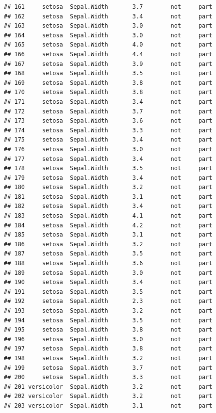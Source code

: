 \documentclass[krantz2]{krantz}\usepackage{knitr}%
\begin{document}
\begin{knitrout}
\begin{kframe}
\begin{verbatim}
## 161     setosa  Sepal.Width       3.7        not     part
## 162     setosa  Sepal.Width       3.4        not     part
## 163     setosa  Sepal.Width       3.0        not     part
## 164     setosa  Sepal.Width       3.0        not     part
## 165     setosa  Sepal.Width       4.0        not     part
## 166     setosa  Sepal.Width       4.4        not     part
## 167     setosa  Sepal.Width       3.9        not     part
## 168     setosa  Sepal.Width       3.5        not     part
## 169     setosa  Sepal.Width       3.8        not     part
## 170     setosa  Sepal.Width       3.8        not     part
## 171     setosa  Sepal.Width       3.4        not     part
## 172     setosa  Sepal.Width       3.7        not     part
## 173     setosa  Sepal.Width       3.6        not     part
## 174     setosa  Sepal.Width       3.3        not     part
## 175     setosa  Sepal.Width       3.4        not     part
## 176     setosa  Sepal.Width       3.0        not     part
## 177     setosa  Sepal.Width       3.4        not     part
## 178     setosa  Sepal.Width       3.5        not     part
## 179     setosa  Sepal.Width       3.4        not     part
## 180     setosa  Sepal.Width       3.2        not     part
## 181     setosa  Sepal.Width       3.1        not     part
## 182     setosa  Sepal.Width       3.4        not     part
## 183     setosa  Sepal.Width       4.1        not     part
## 184     setosa  Sepal.Width       4.2        not     part
## 185     setosa  Sepal.Width       3.1        not     part
## 186     setosa  Sepal.Width       3.2        not     part
## 187     setosa  Sepal.Width       3.5        not     part
## 188     setosa  Sepal.Width       3.6        not     part
## 189     setosa  Sepal.Width       3.0        not     part
## 190     setosa  Sepal.Width       3.4        not     part
## 191     setosa  Sepal.Width       3.5        not     part
## 192     setosa  Sepal.Width       2.3        not     part
## 193     setosa  Sepal.Width       3.2        not     part
## 194     setosa  Sepal.Width       3.5        not     part
## 195     setosa  Sepal.Width       3.8        not     part
## 196     setosa  Sepal.Width       3.0        not     part
## 197     setosa  Sepal.Width       3.8        not     part
## 198     setosa  Sepal.Width       3.2        not     part
## 199     setosa  Sepal.Width       3.7        not     part
## 200     setosa  Sepal.Width       3.3        not     part
## 201 versicolor  Sepal.Width       3.2        not     part
## 202 versicolor  Sepal.Width       3.2        not     part
## 203 versicolor  Sepal.Width       3.1        not     part

\end{verbatim}
\end{kframe}
\end{knitrout}
\end{document}
